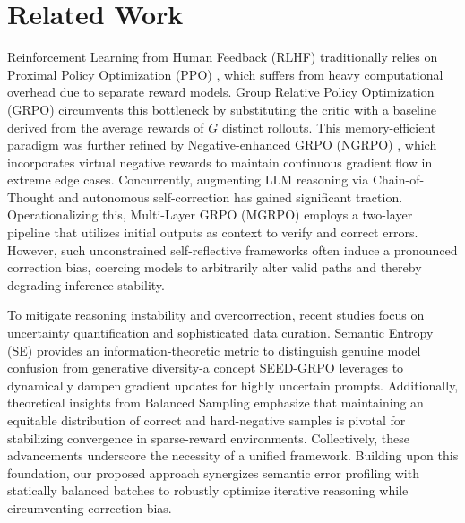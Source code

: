 \section{Related Work}

Reinforcement Learning from Human Feedback (RLHF) \cite{10.5555/3294996.3295184}\cite{Ji2024ReinforcementLF} traditionally relies on Proximal Policy Optimization (PPO) \cite{ppo}, which suffers from heavy computational overhead due to separate reward models. Group Relative Policy Optimization (GRPO) \cite{deepseekmath} circumvents this bottleneck by substituting the critic with a baseline derived from the average rewards of $G$ distinct rollouts. This memory-efficient paradigm was further refined by Negative-enhanced GRPO (NGRPO) \cite{ngrpo}, which incorporates virtual negative rewards to maintain continuous gradient flow in extreme edge cases. Concurrently, augmenting LLM reasoning via Chain-of-Thought \cite{10.5555/3600270.3602070} and autonomous self-correction \cite{madaan2023selfrefineiterativerefinementselffeedback} has gained significant traction. Operationalizing this, Multi-Layer GRPO (MGRPO) \cite{mgrpo} employs a two-layer pipeline that utilizes initial outputs as context to verify and correct errors. However, such unconstrained self-reflective frameworks often induce a pronounced correction bias, coercing models to arbitrarily alter valid paths and thereby degrading inference stability.

To mitigate reasoning instability and overcorrection, recent studies focus on uncertainty quantification and sophisticated data curation. Semantic Entropy (SE) \cite{kuhn2023semantic} provides an information-theoretic metric to distinguish genuine model confusion from generative diversity-a concept SEED-GRPO \cite{seedgrpo} leverages to dynamically dampen gradient updates for highly uncertain prompts. Additionally, theoretical insights from Balanced Sampling \cite{divagrpo} emphasize that maintaining an equitable distribution of correct and hard-negative samples is pivotal for stabilizing convergence in sparse-reward environments. Collectively, these advancements underscore the necessity of a unified framework. Building upon this foundation, our proposed approach synergizes semantic error profiling with statically balanced batches to robustly optimize iterative reasoning while circumventing correction bias.
